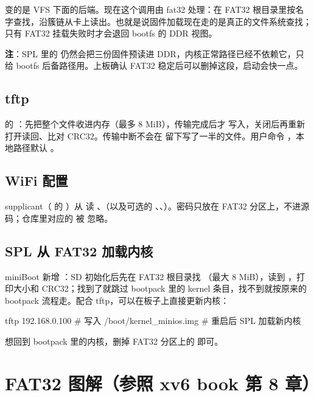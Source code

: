 变的是 VFS 下面的后端。现在这个调用由 fat32 处理：在 FAT32 根目录里按名字查找，沿簇链从卡上读出。也就是说固件加载现在走的是真正的文件系统查找；只有 FAT32 挂载失败时才会退回 bootfs 的 DDR 视图。

\textbf{注}：SPL 里的  仍然会把三份固件预读进 DDR，内核正常路径已经不依赖它，只给 bootfs 后备路径用。上板确认 FAT32 稳定后可以删掉这段，启动会快一点。

\subsection{tftp}

 的 ：先把整个文件收进内存（最多 8 MiB），传输完成后才  写入，关闭后再重新打开读回、比对 CRC32。传输中断不会在  留下写了一半的文件。用户命令 ，本地路径默认 。

\subsection{WiFi 配置}

supplicant（ 的 ）从  读 、（以及可选的 、、）。密码只放在 FAT32 分区上，不进源码；仓库里对应的  被  忽略。

\subsection{SPL 从 FAT32 加载内核}

miniBoot  新增 ：SD 初始化后先在 FAT32 根目录找 （最大 8 MiB），读到 ，打印大小和 CRC32；找到了就跳过 bootpack 里的 kernel 条目，找不到就按原来的 bootpack 流程走。配合 tftp，可以在板子上直接更新内核：

\begin{shcode}
tftp 192.168.0.100                        # 写入 /boot/kernel_minios.img
# 重启后 SPL 加载新内核
\end{shcode}

想回到 bootpack 里的内核，删掉 FAT32 分区上的  即可。

\section{FAT32 图解（参照 xv6 book 第 8 章）}

